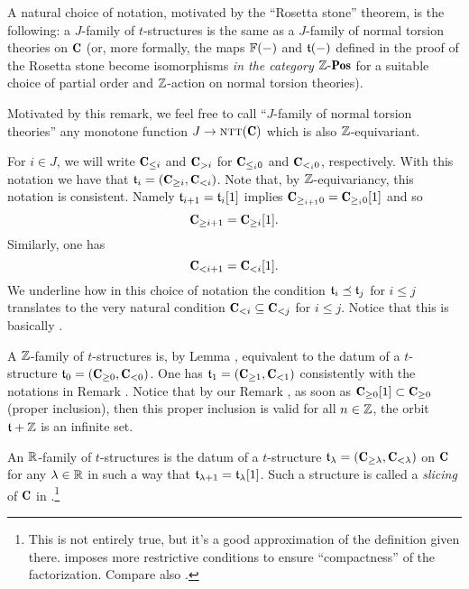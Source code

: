 \documentclass[a4paper,12pt]{amsart}
\renewcommand{\textbf}[1]{\text{\fontseries{b}\selectfont{\upshape #1}}}
\begin{document}
\begin{remark}
A natural choice of notation, motivated by the ``Rosetta stone'' theorem, is the following: a $J$-family of $t$-structures is the same as a $J$-family of normal torsion theories on $\C$ (or, more formally, the maps $\mathbb{F}(-)$ and $\mathfrak{t}(-)$ defined in the proof of the Rosetta stone become isomorphisms \emph{in the category $\Z\text{-}\cate{Pos}$} for a suitable choice of partial order and $\mathbb{Z}$-action on normal torsion theories).

Motivated by this remark, we feel free to call ``$J$-family of normal torsion theories'' any monotone function $J\to \smallcap{ntt}(\C)$ which is also $\mathbb{Z}$-equivariant.
\end{remark}
\begin{notat}\label{magictrick}
For $i\in J$, we will write $\C_{\leq i}$ and $\C_{>i}$ for $\C_{\leq_i0}$ and $\C_{<_i0}$, respectively. With this notation we have that $\tee_i=(\C_{\geq i},\C_{<i})$. Note that, by $\mathbb{Z} $-equivariancy, this notation is consistent. Namely $\mathfrak{t}_{i+1}=\mathfrak{t}_i[1]$ implies $\C_{\geq_{i+1}0}=\C_{\geq_i0}[1]$ and so
\[
\C_{\geq i+1}=\C_{\geq i}[1].
\]
Similarly, one has
\[
\C_{< i+1}=\C_{< i}[1].
\]
We underline how in this choice of notation the condition $\mathfrak{t}_i\preceq \mathfrak{t}_j$ for $i\leq j$ translates to the very natural condition $\C_{<i}\subseteq \C_{<j}$ for $i\leq j$. Notice that this is basically \cite[\adef \textbf{3.1}]{GKR}.
\end{notat}
\begin{example}
A $\mathbb{Z} $-family of $t$-structures is, by Lemma , equivalent to the datum of a $t$-structure $\tee_0=(\C_{\geq 0},\C_{<0})$. One has $\tee_1=(\C_{\geq 1},\C_{<1})$ consistently with the notations in Remark . Notice that by our Remark , as soon as $\C_{\ge 0}[1]\subset \C_{\ge 0}$ (proper inclusion), then this proper inclusion is valid for all $n\in\mathbb{Z}$, \ie the orbit $\mathfrak{t} + \mathbb{Z}$ is an infinite set.
\end{example}
\begin{example}\label{what.s.slici}
An $\mathbb{R}$-family of $t$-structures is the datum of a $t$-structure $\tee_\lambda=(\C_{\geq \lambda},\C_{<\lambda})$ on $\C$ for any $\lambda\in \mathbb{R}$ in such a way that $\mathfrak{t}_{\lambda+1}=\mathfrak{t}_\lambda[1]$. Such a structure is called a \emph{slicing} of $\C$ in \cite{Brid}.\footnote{This is not entirely true, but it's a good approximation of the definition given there. \cite{Brid} imposes more restrictive conditions to ensure ``compactness'' of the factorization. Compare also \cite{GKR}.} 
\end{example}
\end{document}
